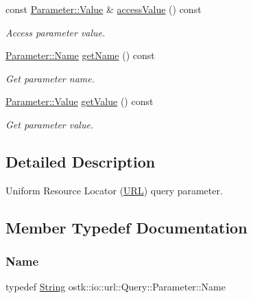 \begin{DoxyCompactItemize}
const \hyperlink{classostk_1_1io_1_1url_1_1_query_1_1_parameter_ada177e3a9d839a7900aae8a718207bbd}{Parameter\+::\+Value} \& \hyperlink{classostk_1_1io_1_1url_1_1_query_1_1_parameter_aea51f7a0c4389c5729533a3068a39b74}{access\+Value} () const
\begin{DoxyCompactList}\small\item\em Access parameter value. \end{DoxyCompactList}\item 
\hyperlink{classostk_1_1io_1_1url_1_1_query_1_1_parameter_ad176899a3555e0d0efeb0c13f73a8a80}{Parameter\+::\+Name} \hyperlink{classostk_1_1io_1_1url_1_1_query_1_1_parameter_a78bc96d90e5cab55b26d6c44a69ea3f6}{get\+Name} () const
\begin{DoxyCompactList}\small\item\em Get parameter name. \end{DoxyCompactList}\item 
\hyperlink{classostk_1_1io_1_1url_1_1_query_1_1_parameter_ada177e3a9d839a7900aae8a718207bbd}{Parameter\+::\+Value} \hyperlink{classostk_1_1io_1_1url_1_1_query_1_1_parameter_afe5091adccaa6bcf5840d1ca88b24f9c}{get\+Value} () const
\begin{DoxyCompactList}\small\item\em Get parameter value. \end{DoxyCompactList}\end{DoxyCompactItemize}


\subsection{Detailed Description}
Uniform Resource Locator (\hyperlink{classostk_1_1io_1_1_u_r_l}{U\+RL}) query parameter. 

\subsection{Member Typedef Documentation}
\mbox{\label{classostk_1_1io_1_1url_1_1_query_1_1_parameter_ad176899a3555e0d0efeb0c13f73a8a80}} 
\subsubsection{\texorpdfstring{Name}{Name}}
{\footnotesize\ttfamily typedef \hyperlink{namespaceostk_1_1io_a95d49b120613a7610cb1b4f03b1116b6}{String} ostk\+::io\+::url\+::\+Query\+::\+Parameter\+::\+Name}

